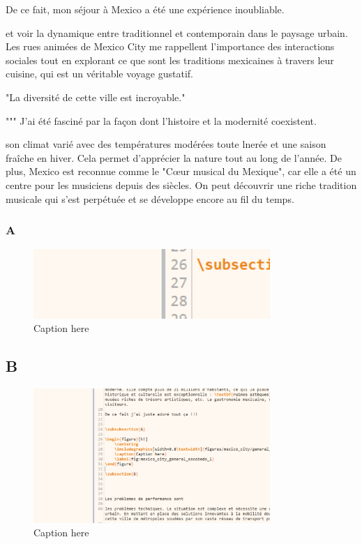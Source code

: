 \documentclass[12pt, a4paper]{article}
\begin{document}
De ce fait, mon séjour à Mexico a été une expérience inoubliable.

et voir la dynamique entre traditionnel et contemporain dans le paysage urbain. Les rues animées de Mexico City me rappellent l’importance des interactions sociales tout en explorant ce que sont les traditions mexicaines à travers leur cuisine, qui est un véritable voyage gustatif.

"La diversité de cette ville est incroyable."

"""  J'ai été fasciné par la façon dont l'histoire et la modernité coexistent.


son climat varié avec des températures modérées toute lnerée et une saison fraîche en hiver. Cela permet d’apprécier la nature tout au long de l’année. De plus, Mexico est reconnue comme le "Cœur musical du Mexique", car elle a été un centre pour les musiciens depuis des siècles. On peut découvrir une riche tradition musicale qui s'est perpétuée et se développe encore au fil du temps.


\subsubsection{A}

\begin{figure}[h!]
    \centering
    \includegraphics[width=0.8\textwidth]{figures/mexico_city/general_escobedo/a/fig_1.png}
    \caption{Caption here}
    \label{fig:mexico_city_general_escobedo_1}
\end{figure}

\subsection{B}


\begin{figure}[h!]
    \centering
    \includegraphics[width=0.8\textwidth]{figures/mexico_city/b/default/fig_1.png}
    \caption{Caption here}
    \label{fig:mexico_city_b_1}
\end{figure}
\end{document}
